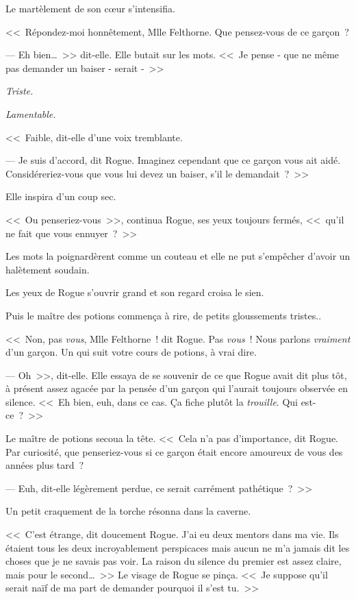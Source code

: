 Le martèlement de son cœur s'intensifia.

<<~Répondez-moi honnêtement, Mlle Felthorne. Que pensez-vous de ce garçon~?

--- Eh bien…~>> dit-elle. Elle butait sur les mots. <<~Je pense - que ne même pas demander un baiser - serait -~>>

\emph{Triste.}

\emph{Lamentable.}

<<~Faible, dit-elle d'une voix tremblante.

--- Je suis d'accord, dit Rogue. Imaginez cependant que ce garçon vous ait aidé. Considéreriez-vous que vous lui devez un baiser, s'il le demandait~?~>>

Elle inspira d'un coup sec.

<<~Ou penseriez-vous~>>, continua Rogue, ses yeux toujours fermés, <<~qu'il ne fait que vous ennuyer~?~>>

Les mots la poignardèrent comme un couteau et elle ne put s'empêcher d'avoir un halètement soudain.

Les yeux de Rogue s'ouvrir grand et son regard croisa le sien.

Puis le maître des potions commença à rire, de petits gloussements tristes..

<<~Non, pas \emph{vous}, Mlle Felthorne~! dit Rogue. Pas \emph{vous}~! Nous parlons \emph{vraiment} d'un garçon. Un qui suit votre cours de potions, à vrai dire.

--- Oh~>>, dit-elle. Elle essaya de se souvenir de ce que Rogue avait dit plus tôt, à présent assez agacée par la pensée d'un garçon qui l'aurait toujours observée en silence. <<~Eh bien, euh, dans ce cas. Ça fiche plutôt la \emph{trouille}. Qui est-ce~?~>>

Le maître de potions secoua la tête. <<~Cela n'a pas d'importance, dit Rogue. Par curiosité, que penseriez-vous si ce garçon était encore amoureux de vous des années plus tard~?

--- Euh, dit-elle légèrement perdue, ce serait carrément pathétique~?~>>

Un petit craquement de la torche résonna dans la caverne.

<<~C'est étrange, dit doucement Rogue. J'ai eu deux mentors dans ma vie. Ils étaient tous les deux incroyablement perspicaces mais aucun ne m'a jamais dit les choses que je ne savais pas voir. La raison du silence du premier est assez claire, mais pour le second…~>> Le visage de Rogue se pinça. <<~Je suppose qu'il serait naïf de ma part de demander pourquoi il s'est tu.~>>


